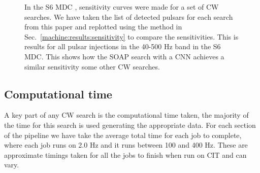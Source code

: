 \begin{figure}
	\caption[S6 \gls{MDC} results from SOAP and \gls{CNN} search.]{\label{machine:results:s6mdc} In the S6 \gls{MDC} \cite{walsh2016ComparisonMethods}, sensitivity curves were made for a set of \gls{CW} searches. 
		We have taken the list of detected pulsars for each search from this paper \cite{walsh2016ComparisonMethods} and replotted using the method in Sec.~\ref{machine:results:sensitivity} to compare the sensitivities. 
		This is results for all pulsar injections in the 40-500 Hz band in the S6 \gls{MDC}.
		This shows how the SOAP search with a \gls{CNN} achieves a similar sensitivity some other \gls{CW} searches. 
	}
	
\end{figure}


\subsection{\label{machine:results:timing} Computational time}

A key part of any \gls{CW} search is the computational time taken, the majority of the time for this search is used generating the appropriate data. 
For each section of the pipeline we have take the average total time for each job to complete, where each job runs on 2.0 Hz and it runs between 100 and 400 Hz. These are approximate timings taken for all the jobs to finish when run on CIT and can vary.

